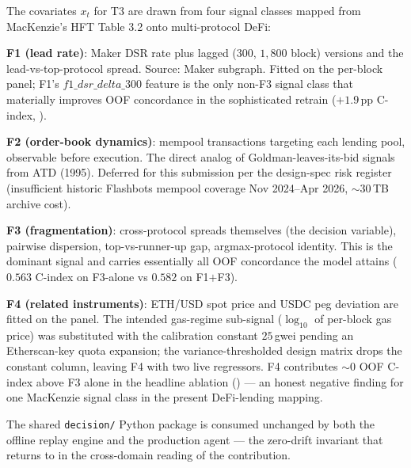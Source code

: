 The covariates $x_t$ for T3 are drawn from four signal classes
mapped from MacKenzie's HFT Table 3.2 \cite{mackenzie2021} onto
multi-protocol DeFi:

\textbf{F1 (lead rate)}: Maker DSR rate plus lagged ($300$, $1{,}800$
block) versions and the lead-vs-top-protocol spread.  Source:
Maker subgraph.  Fitted on the per-block panel; F1's
$f1\_dsr\_delta\_300$ feature is the only non-F3 signal class that
materially improves OOF concordance in the sophisticated retrain
($+1.9$\,pp C-index, ).

\textbf{F2 (order-book dynamics)}: mempool transactions targeting
each lending pool, observable before execution.  The direct
analog of Goldman-leaves-its-bid signals from ATD (1995).
Deferred for this submission per the design-spec risk register
(insufficient historic Flashbots mempool coverage
Nov 2024--Apr 2026, $\sim 30$\,TB archive cost).

\textbf{F3 (fragmentation)}: cross-protocol spreads themselves
(the decision variable), pairwise dispersion, top-vs-runner-up
gap, argmax-protocol identity.  This is the dominant signal and
carries essentially all OOF concordance the model attains
($0.563$ C-index on F3-alone vs $0.582$ on F1$+$F3).

\textbf{F4 (related instruments)}: ETH/USD spot price and
USDC peg deviation are fitted on the panel.  The intended gas-regime
sub-signal ($\log_{10}$ of per-block gas price) was substituted with
the calibration constant $25$\,gwei pending an Etherscan-key quota
expansion; the variance-thresholded design matrix drops the constant
column, leaving F4 with two live regressors.  F4 contributes $\sim 0$
OOF C-index above F3 alone in the headline ablation ()
--- an honest negative finding for one MacKenzie signal class in
the present DeFi-lending mapping.

The shared \texttt{decision/} Python package is consumed unchanged
by both the offline replay engine and the production agent --- the
zero-drift invariant that  returns to in the
cross-domain reading of the contribution.
